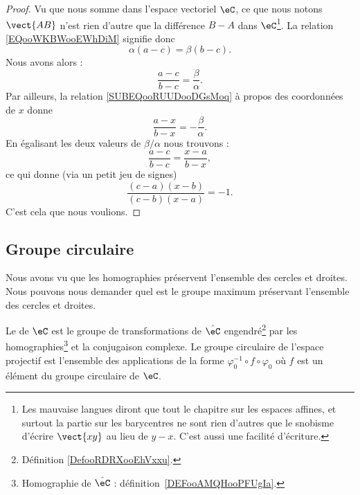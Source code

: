 \begin{proof}
	Vu que nous somme dans l'espace vectoriel \( \eC\), ce que nous notons \( \vect{ AB }\) n'est rien d'autre que la différence \( B-A\) dans \( \eC\)\footnote{Les mauvaise langues diront que tout le chapitre sur les espaces affines, et surtout la partie sur les barycentres ne sont rien d'autres que le snobisme d'écrire \( \vect{ xy }\) au lieu de \( y-x\). C'est aussi une facilité d'écriture.}. La relation \eqref{EQooWKBWooEWhDiM} signifie donc
	\begin{equation}
		\alpha(a-c)=\beta(b-c).
	\end{equation}
	Nous avons alors :
	\begin{equation}
		\frac{ a-c }{ b-c }=\frac{ \beta }{ \alpha }.
	\end{equation}
	Par ailleurs, la relation \eqref{SUBEQooRUUDooDGsMoq} à propos des coordonnées de \( x\) donne
	\begin{equation}
		\frac{ a-x }{ b-x }=-\frac{ \beta }{ \alpha }.
	\end{equation}
	En égalisant les deux valeurs de \( \beta/\alpha\) nous trouvons :
	\begin{equation}
		\frac{ a-c }{ b-c }=\frac{ x-a }{ b-x },
	\end{equation}
	ce qui donne (via un petit jeu de signes)
	\begin{equation}
		\frac{ (c-a)(x-b) }{ (c-b)(x-a) }=-1.
	\end{equation}
	C'est cela que nous voulions.
\end{proof}

\subsection{Groupe circulaire}

Nous avons vu que les homographies préservent l'ensemble des cercles et droites. Nous pouvons nous demander quel est le groupe maximum préservant l'ensemble des cercles et droites.

\begin{definition}
	Le  de \( \eC\) est le groupe de transformations de \( \hat \eC  \) engendré\footnote{Définition \ref{DefooRDRXooEhVxxu}.} par les homographies\footnote{Homographie de \( \hat\eC\) : définition~\ref{DEFooAMQHooPFUgIa}.} et la conjugaison complexe. Le groupe circulaire de l'espace projectif est l'ensemble des applications de la forme \( \varphi_0^{-1}\circ f\circ\varphi_0\) où \( f\) est un élément du groupe circulaire de \( \eC\).
\end{definition}

